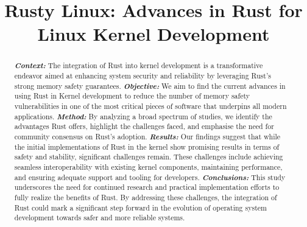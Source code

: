 \documentclass[sigconf,review,anonymous]{acmart}
\begin{document}
\title{Rusty Linux: Advances in Rust for Linux Kernel Development}





\begin{abstract}

  \textit{\textbf{Context:}} The integration of Rust into kernel development is a transformative endeavor aimed
  at enhancing system security and reliability by leveraging Rust's strong memory safety
  guarantees. 
  \textit{\textbf{Objective:}} We aim to find the current advances in using Rust in Kernel
  development to reduce the number of memory safety
  vulnerabilities in one of the most critical pieces of software that underpins all modern
  applications.
  \textit{\textbf{Method:}} By analyzing a broad spectrum of studies, we identify the advantages Rust offers,
  highlight the challenges faced,
  and emphasise the need for community consensus on Rust's adoption.
  \textit{\textbf{Results:}} Our findings suggest that while the initial implementations of Rust in the kernel
  show promising results in terms of safety and stability, significant challenges remain. These challenges
  include achieving seamless interoperability with existing kernel components, maintaining
  performance, and ensuring adequate support and tooling for developers.
  \textit{\textbf{Conclusions:}} This study 
  underscores the need for
  continued research and practical implementation efforts to fully realize the benefits of Rust. By
  addressing these challenges, the integration of Rust could mark a significant step forward in the
  evolution of operating system development towards safer and more reliable systems.

\end{abstract}
\end{document}
